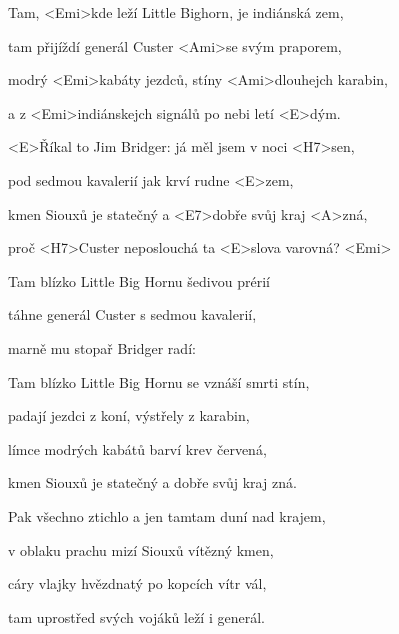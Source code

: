 

\zs
Tam, <Emi>kde leží Little Bighorn, je indiánská zem,

tam přijíždí generál Custer <Ami>se svým praporem,

modrý <Emi>kabáty jezdců, stíny <Ami>dlouhejch karabin,

a z <Emi>indiánskejch signálů po nebi letí <E>dým.
\ks

\zr
<E>Říkal to Jim Bridger: já měl jsem v noci <H7>sen,

pod sedmou kavalerií jak krví rudne <E>zem,

kmen Siouxů je statečný a <E7>dobře svůj kraj <A>zná,

proč <H7>Custer neposlouchá ta <E>slova varovná? <Emi>
\kr

\zs
Tam blízko Little Big Hornu šedivou prérií

táhne generál Custer s sedmou kavalerií,

marně mu stopař Bridger radí: 
\ks

\zr\kr

\zs
Tam blízko Little Big Hornu se vznáší smrti stín,


padají jezdci z koní, výstřely z karabin,

límce modrých kabátů barví krev červená,

kmen Siouxů je statečný a dobře svůj kraj zná.
\ks

\zr\kr

\zs
Pak všechno ztichlo a jen tamtam duní nad krajem,

v oblaku prachu mizí Siouxů vítězný kmen,

cáry vlajky hvězdnatý po kopcích vítr vál,

tam uprostřed svých vojáků leží i generál.
\ks

\zr\kr

\kp
